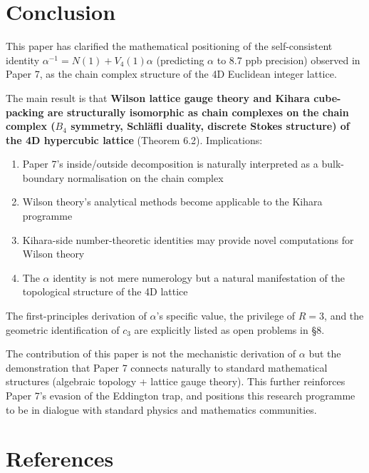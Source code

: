 \documentclass[a4paper,11pt]{article}
\begin{document}
\section{Conclusion}

This paper has clarified the mathematical positioning of the self-consistent identity $\alpha^{-1} = N(1) + V_4(1)\alpha$ (predicting $\alpha$ to 8.7 ppb precision) observed in Paper 7, as the chain complex structure of the 4D Euclidean integer lattice.

The main result is that \textbf{Wilson lattice gauge theory and Kihara cube-packing are structurally isomorphic as chain complexes on the chain complex ($B_4$ symmetry, Schl\"afli duality, discrete Stokes structure) of the 4D hypercubic lattice} (Theorem 6.2). Implications:

\begin{enumerate}
\item Paper 7's inside/outside decomposition is naturally interpreted as a bulk-boundary normalisation on the chain complex
\item Wilson theory's analytical methods become applicable to the Kihara programme
\item Kihara-side number-theoretic identities may provide novel computations for Wilson theory
\item The $\alpha$ identity is not mere numerology but a natural manifestation of the topological structure of the 4D lattice
\end{enumerate}

The first-principles derivation of $\alpha$'s specific value, the privilege of $R = 3$, and the geometric identification of $c_3$ are explicitly listed as open problems in §8.

The contribution of this paper is not the mechanistic derivation of $\alpha$ but the demonstration that Paper 7 connects naturally to standard mathematical structures (algebraic topology + lattice gauge theory). This further reinforces Paper 7's evasion of the Eddington trap, and positions this research programme to be in dialogue with standard physics and mathematics communities.

\section*{References}
\end{document}
